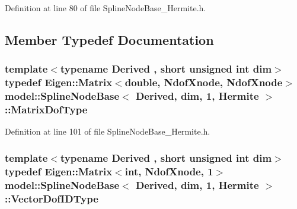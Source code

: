 Definition at line 80 of file Spline\+Node\+Base\+\_\+\+Hermite.\+h.



\subsection{Member Typedef Documentation}
\hypertarget{classmodel_1_1_spline_node_base_3_01_derived_00_01dim_00_011_00_01_hermite_01_4_a6ff56666ddaf60f664205a307851c12a}{}
\subsubsection[{Matrix\+Dof\+Type}]{\setlength{\rightskip}{0pt plus 5cm}template$<$typename Derived , short unsigned int dim$>$ typedef Eigen\+::\+Matrix$<$double, {\bf Ndof\+Xnode}, {\bf Ndof\+Xnode}$>$ {\bf model\+::\+Spline\+Node\+Base}$<$ Derived, {\bf dim}, 1, {\bf Hermite} $>$\+::{\bf Matrix\+Dof\+Type}}\label{classmodel_1_1_spline_node_base_3_01_derived_00_01dim_00_011_00_01_hermite_01_4_a6ff56666ddaf60f664205a307851c12a}


Definition at line 101 of file Spline\+Node\+Base\+\_\+\+Hermite.\+h.

\hypertarget{classmodel_1_1_spline_node_base_3_01_derived_00_01dim_00_011_00_01_hermite_01_4_a3b6d0c33098f2d713c2ac7327a714190}{}
\subsubsection[{Vector\+Dof\+I\+D\+Type}]{\setlength{\rightskip}{0pt plus 5cm}template$<$typename Derived , short unsigned int dim$>$ typedef Eigen\+::\+Matrix$<$int, {\bf Ndof\+Xnode}, 1$>$ {\bf model\+::\+Spline\+Node\+Base}$<$ Derived, {\bf dim}, 1, {\bf Hermite} $>$\+::{\bf Vector\+Dof\+I\+D\+Type}}\label{classmodel_1_1_spline_node_base_3_01_derived_00_01dim_00_011_00_01_hermite_01_4_a3b6d0c33098f2d713c2ac7327a714190}


